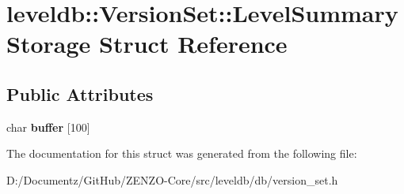\hypertarget{structleveldb_1_1_version_set_1_1_level_summary_storage}{}\section{leveldb\+::Version\+Set\+::Level\+Summary\+Storage Struct Reference}
\label{structleveldb_1_1_version_set_1_1_level_summary_storage}
\subsection*{Public Attributes}
\begin{DoxyCompactItemize}
\item 
\mbox{\label{structleveldb_1_1_version_set_1_1_level_summary_storage_a90b283461affa0f25f41bc21a9c81bbc}} 
char {\bfseries buffer} \mbox{[}100\mbox{]}
\end{DoxyCompactItemize}


The documentation for this struct was generated from the following file\+:\begin{DoxyCompactItemize}
\item 
D\+:/\+Documentz/\+Git\+Hub/\+Z\+E\+N\+Z\+O-\/\+Core/src/leveldb/db/version\+\_\+set.\+h\end{DoxyCompactItemize}
